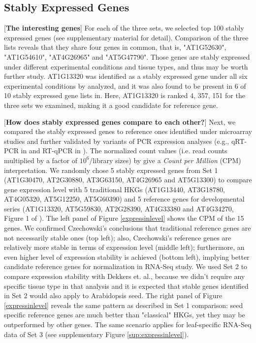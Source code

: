 \documentclass[11pt, a4paper]{article}
\begin{document}
 \subsection{Stably Expressed Genes}
 [\textbf{The interesting genes}]
  For each of the three sets, we selected top 100 stably expressed genes (see supplementary material for detail). %
Comparison of the three lists reveals that they share four genes in common, that is, "AT1G52630", "AT1G54610", "AT4G26965" and "AT5G47790".  Those genes are stably expressed under different experimental conditions and tissue types, and thus may be worth further study. AT1G13320 was identified  as a stably expressed gene under all six experimental conditions by \cite{hong2010identification} analyzed, and it was also found to be present in 6 of 10 stably expressed gene lists in\cite{czechowski2005genome}.  Here, AT1G13320 is ranked 4, 357, 151 for the three sets we examined, making it a good candidate for reference gene.

[\textbf{How does stably expressed genes compare to each other?}]
Next, we compared the stably expressed genes to reference ones identified under microarray studies and further validated by variants of PCR expression analyses (e.g., qRT-PCR in \cite{czechowski2005genome} and RT-qPCR in \cite{dekkers2012identification}). The normalized count values  (i.e. read counts multiplied by a factor of  $10^6$/library sizes) by \cite{anders2013count} give a \textit{Count per Million} (CPM) interpretation.  We randomly chose 5 stably expressed genes from Set 1 (AT1G30470, AT2G30880, AT3G63150, AT4G26965 and AT5G13300) to compare gene expression level with 5 traditional HKGs  (AT1G13440, AT3G18780, AT4G05320, AT5G12250, AT5G60390) and 5  reference genes  for developmental series (AT1G13320, AT5G59830, AT2G28390, AT4G33380 and AT4G34270, Figure 1 of \cite{czechowski2005genome}). The left panel of  Figure \ref{expressinlevel} shows the CPM of the 15 genes. We confirmed Czechowski's conclusions that traditional reference genes are not necessarily stable ones (top left); also, Czechowski's reference genes are relatively more stable in terms of expression level (middle left); furthermore, an even higher level of expression stability is achieved (bottom left), implying better candidate reference genes for normalization in RNA-Seq study. We used Set 2 to compare expression stability with Dekkers et. al., because we didn't require any specific tissue type in that analysis and  it is expected that stable genes identified in Set 2 would also apply to Arabidopsis seed. The right panel of Figure \ref{expressinlevel} reveals the same pattern as described in Set 1 comparison: seed specific reference genes are much better than "classical" HKGs, yet they may be outperformed by other genes.  The same scenario applies for leaf-specific RNA-Seq data of Set 3 (see supplementary Figure \ref{sup:expressinlevel}).  %
\end{document}
